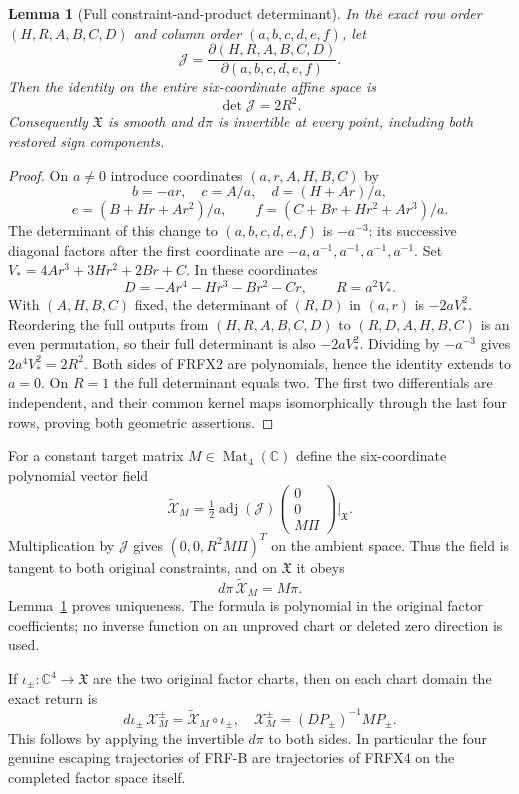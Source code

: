 \documentclass[11pt]{article}
\newtheorem{lemma}[theorem]{Lemma}
\newcommand{\C}{\mathbb C}
\newcommand{\adj}{\operatorname{adj}}
\begin{document}
\begin{lemma}[Full constraint-and-product determinant]\label{lem:jac}
In the exact row order $(H,R,A,B,C,D)$ and column order $(a,b,c,d,e,f)$,
let
\[
 \mathcal J=\frac{\partial(H,R,A,B,C,D)}{\partial(a,b,c,d,e,f)}.
\]
Then the identity on the entire six-coordinate affine space is
\[
 \boxed{\det\mathcal J=2R^2.}\tag{FRFX2}
\]
Consequently $\mathfrak X$ is smooth and $d\pi$ is invertible at every
point, including both restored sign components.
\end{lemma}
\begin{proof}
On $a\ne0$ introduce coordinates $(a,r,A,H,B,C)$ by
\[
 b=-ar,\quad c=A/a,\quad d=(H+Ar)/a,
\]
\[
 e=(B+Hr+Ar^2)/a,\qquad f=(C+Br+Hr^2+Ar^3)/a.
 \tag{FRFX3}
\]
The determinant of this change to $(a,b,c,d,e,f)$ is $-a^{-3}$: its
successive diagonal factors after the first coordinate are
$-a,a^{-1},a^{-1},a^{-1},a^{-1}$.
Set $V_*=4Ar^3+3Hr^2+2Br+C$. In these coordinates
\[
 D=-Ar^4-Hr^3-Br^2-Cr,\qquad R=a^2V_*.
\]
With $(A,H,B,C)$ fixed, the determinant of $(R,D)$ in $(a,r)$ is
$-2aV_*^2$. Reordering the full outputs from $(H,R,A,B,C,D)$ to
$(R,D,A,H,B,C)$ is an even permutation, so their full determinant is
also $-2aV_*^2$. Dividing by $-a^{-3}$ gives $2a^4V_*^2=2R^2$.
Both sides of FRFX2 are polynomials, hence the identity extends to $a=0$.
On $R=1$ the full determinant equals two. The first two differentials
are independent, and their common kernel maps isomorphically through
the last four rows, proving both geometric assertions.
\end{proof}

For a constant target matrix $M\in\operatorname{Mat}_4(\C)$ define the
six-coordinate polynomial vector field
\[
 \boxed{\widetilde{\mathcal X}_M
 =\tfrac12\adj(\mathcal J)
       \begin{pmatrix}0\\0\\M\Pi\end{pmatrix}\bigg|_{\mathfrak X}.}
 \tag{FRFX4}
\]
Multiplication by $\mathcal J$ gives $(0,0,R^2M\Pi)^T$ on the ambient
space. Thus the field is tangent to both original constraints, and on
$\mathfrak X$ it obeys
\[
 d\pi\,\widetilde{\mathcal X}_M=M\pi.
 \tag{FRFX5}
\]
Lemma~\ref{lem:jac} proves uniqueness. The formula is polynomial in the
original factor coefficients; no inverse function on an unproved chart
or deleted zero direction is used.

If $\iota_\pm:\C^4\to\mathfrak X$ are the two original factor charts,
then on each chart domain the exact return is
\[
 d\iota_\pm\,\mathcal X_M^\pm
       =\widetilde{\mathcal X}_M\circ\iota_\pm,
\quad \mathcal X_M^\pm=(DP_\pm)^{-1}MP_\pm.
 \tag{FRFX6}
\]
This follows by applying the invertible $d\pi$ to both sides. In
particular the four genuine escaping trajectories of FRF-B are trajectories
of FRFX4 on the completed factor space itself.
\end{document}
